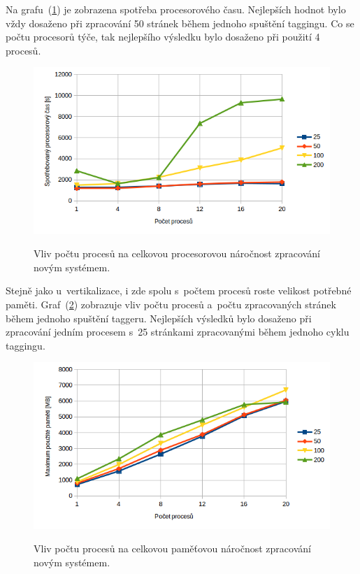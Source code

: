 Na grafu~(\ref{graph:graph_tagging_procesorovy_cas}) je zobrazena spotřeba procesorového času.
Nejlepších hodnot bylo vždy dosaženo při zpracování 50 stránek během jednoho spuštění taggingu.
Co se počtu procesorů týče, tak nejlepšího výsledku bylo dosaženo při použití 4 procesů.

\begin{figure}[H]
    \begin{center}
        \label{graph:graph_tagging_procesorovy_cas}
        \includegraphics[width=1.0\textwidth]{obrazky-figures/graph_tagging_procesorovy_cas.png}
        \caption{Vliv počtu procesů na celkovou procesorovou náročnost zpracování novým systémem.}
    \end{center}
\end{figure}

Stejně jako u~vertikalizace, i zde spolu s~počtem procesů roste velikost potřebné paměti.
Graf~(\ref{graph:graph_tagging_pamet}) zobrazuje vliv počtu procesů a~počtu zpracovaných stránek
během jednoho spuštění taggeru. Nejlepších výsledků bylo dosaženo při zpracování jedním procesem
s~25 stránkami zpracovanými během jednoho cyklu taggingu.

\begin{figure}[H]
    \begin{center}
        \label{graph:graph_tagging_pamet}
        \includegraphics[width=1.0\textwidth]{obrazky-figures/graph_tagging_pamet.png}
        \caption{Vliv počtu procesů na celkovou paměťovou náročnost zpracování novým systémem.}
    \end{center}
\end{figure}

